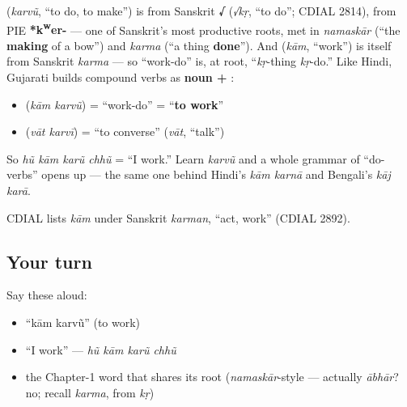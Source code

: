 \begin{cousinweb}
\textbf{} (\emph{karvũ}, \textquotedblleft{}to do, to make\textquotedblright{}) is from Sanskrit \textbf{√} (\emph{√kṛ}, \textquotedblleft{}to do\textquotedblright{}; CDIAL 2814), from PIE \textbf{*k\textsuperscript{w}er-} — one of Sanskrit's most productive roots, met in \emph{namaskār} (\textquotedblleft{}the \textbf{making} of a bow\textquotedblright{}) and \emph{karma} (\textquotedblleft{}a thing \textbf{done}\textquotedblright{}). And \textbf{} (\emph{kām}, \textquotedblleft{}work\textquotedblright{}) is itself from Sanskrit \emph{karma} — so \textquotedblleft{}work-do\textquotedblright{} is, at root, \textquotedblleft{}\emph{kṛ}-thing \emph{kṛ}-do.\textquotedblright{} Like Hindi, Gujarati builds compound verbs as \textbf{noun + }:

\begin{itemize}
\raggedright
  \item \textbf{ } (\emph{kām karvũ}) = \textquotedblleft{}work-do\textquotedblright{} = \textquotedblleft{}\textbf{to work}\textquotedblright{}
  \item \textbf{ } (\emph{vāt karvī}) = \textquotedblleft{}to converse\textquotedblright{} (\emph{vāt}, \textquotedblleft{}talk\textquotedblright{})
\end{itemize}

So \emph{hũ kām karũ chhũ} = \textquotedblleft{}I work.\textquotedblright{} Learn \emph{karvũ} and a whole grammar of \textquotedblleft{}do-verbs\textquotedblright{} opens up — the same one behind Hindi's \emph{kām karnā} and Bengali's \emph{kāj karā}.

CDIAL lists \emph{kām} under Sanskrit \emph{karman}, \textquotedblleft{}act, work\textquotedblright{} (CDIAL 2892).
\end{cousinweb}

\subsection*{Your turn}
Say these aloud:

\begin{itemize}
\raggedright
  \item \textquotedblleft{}kām karvũ\textquotedblright{} (to work)
  \item \textquotedblleft{}I work\textquotedblright{} — \emph{hũ kām karũ chhũ}
  \item the Chapter-1 word that shares its root (\emph{namaskār}-style — actually \emph{ābhār}? no; recall \emph{karma}, from \emph{kṛ})
\end{itemize}

